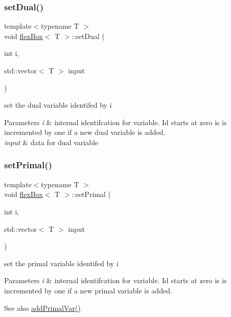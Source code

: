 \subsubsection{\texorpdfstring{set\+Dual()}{setDual()}}
{\footnotesize\ttfamily template$<$typename T $>$ \\
void \hyperlink{classflex_box}{flex\+Box}$<$ T $>$\+::set\+Dual (\begin{DoxyParamCaption}\item[{int}]{i,  }\item[{std\+::vector$<$ T $>$}]{input }\end{DoxyParamCaption})\hspace{0.3cm}{\ttfamily [inline]}}



set the dual variable identifed by i 


\begin{DoxyParams}{Parameters}
{\em i} & internal identifcation for variable. Id starts at zero is is incremented by one if a new dual variable is added. \\
\hline
{\em input} & data for dual variable \\
\hline
\end{DoxyParams}
\mbox{\label{classflex_box_aacb08dc862943d6bb24353a62e2c9341}} 
\subsubsection{\texorpdfstring{set\+Primal()}{setPrimal()}}
{\footnotesize\ttfamily template$<$typename T $>$ \\
void \hyperlink{classflex_box}{flex\+Box}$<$ T $>$\+::set\+Primal (\begin{DoxyParamCaption}\item[{int}]{i,  }\item[{std\+::vector$<$ T $>$}]{input }\end{DoxyParamCaption})\hspace{0.3cm}{\ttfamily [inline]}}



set the primal variable identifed by i 


\begin{DoxyParams}{Parameters}
{\em i} & internal identifcation for variable. Id starts at zero is is incremented by one if a new primal variable is added. \\
\hline
\end{DoxyParams}
\begin{DoxySeeAlso}{See also}
\hyperlink{classflex_box_a659aac107b85ecf64c9fd1aaa465a98d}{add\+Primal\+Var()} 
\end{DoxySeeAlso}

